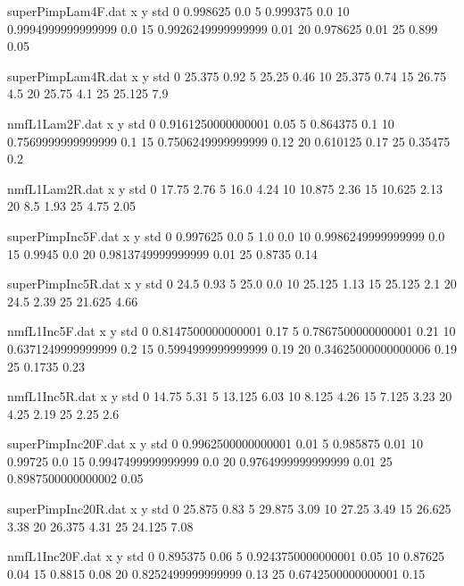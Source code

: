 \begin{filecontents}{superPimpLam4F.dat}
x y std
0 0.998625 0.0
5 0.999375 0.0
10 0.9994999999999999 0.0
15 0.9926249999999999 0.01
20 0.978625 0.01
25 0.899 0.05
\end{filecontents}
\begin{filecontents}{superPimpLam4R.dat}
x y std
0 25.375 0.92
5 25.25 0.46
10 25.375 0.74
15 26.75 4.5
20 25.75 4.1
25 25.125 7.9
\end{filecontents}
\begin{filecontents}{nmfL1Lam2F.dat}
x y std
0 0.9161250000000001 0.05
5 0.864375 0.1
10 0.7569999999999999 0.1
15 0.7506249999999999 0.12
20 0.610125 0.17
25 0.35475 0.2
\end{filecontents}
\begin{filecontents}{nmfL1Lam2R.dat}
x y std
0 17.75 2.76
5 16.0 4.24
10 10.875 2.36
15 10.625 2.13
20 8.5 1.93
25 4.75 2.05
\end{filecontents}
\begin{filecontents}{superPimpInc5F.dat}
x y std
0 0.997625 0.0
5 1.0 0.0
10 0.9986249999999999 0.0
15 0.9945 0.0
20 0.9813749999999999 0.01
25 0.8735 0.14
\end{filecontents}
\begin{filecontents}{superPimpInc5R.dat}
x y std
0 24.5 0.93
5 25.0 0.0
10 25.125 1.13
15 25.125 2.1
20 24.5 2.39
25 21.625 4.66
\end{filecontents}
\begin{filecontents}{nmfL1Inc5F.dat}
x y std
0 0.8147500000000001 0.17
5 0.7867500000000001 0.21
10 0.6371249999999999 0.2
15 0.5994999999999999 0.19
20 0.34625000000000006 0.19
25 0.1735 0.23
\end{filecontents}
\begin{filecontents}{nmfL1Inc5R.dat}
x y std
0 14.75 5.31
5 13.125 6.03
10 8.125 4.26
15 7.125 3.23
20 4.25 2.19
25 2.25 2.6
\end{filecontents}
\begin{filecontents}{superPimpInc20F.dat}
x y std
0 0.9962500000000001 0.01
5 0.985875 0.01
10 0.99725 0.0
15 0.9947499999999999 0.0
20 0.9764999999999999 0.01
25 0.8987500000000002 0.05
\end{filecontents}
\begin{filecontents}{superPimpInc20R.dat}
x y std
0 25.875 0.83
5 29.875 3.09
10 27.25 3.49
15 26.625 3.38
20 26.375 4.31
25 24.125 7.08
\end{filecontents}
\begin{filecontents}{nmfL1Inc20F.dat}
x y std
0 0.895375 0.06
5 0.9243750000000001 0.05
10 0.87625 0.04
15 0.8815 0.08
20 0.8252499999999999 0.13
25 0.6742500000000001 0.15
\end{filecontents}
